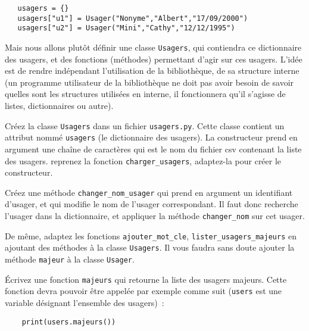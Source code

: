 \documentclass[10pt,a4paper]{sujets-exercices}
\begin{document}
\begin{verbatim}
   usagers = {}
   usagers["u1"] = Usager("Nonyme","Albert","17/09/2000")
   usagers["u2"] = Usager("Mini","Cathy","12/12/1995")
\end{verbatim}

Mais nous allons plutôt définir une classe \texttt{Usagers}, qui contiendra ce dictionnaire des usagers, et des fonctions (méthodes) permettant d'agir sur ces usagers. L'idée est de rendre indépendant l'utilisation de la bibliothèque, de sa structure interne (un programme utilisateur de la bibliothèque ne doit pas avoir besoin de savoir quelles sont les structures utilisées en interne, il fonctionnera qu'il s'agisse de listes, dictionnaires ou autre).

\exercice{} Créez la classe \texttt{Usagers} dans un fichier \texttt{usagers.py}. Cette classe contient un attribut nommé \texttt{usagers} (le dictionnaire des usagers). La constructeur prend en argument une chaîne de caractères qui est le nom du fichier csv contenant la liste des usagers. reprenez la fonction \texttt{charger\_usagers}, adaptez-la pour créer le constructeur.

\exercice{} Créez une méthode \texttt{changer\_nom\_usager} qui prend en argument un identifiant d'usager, et qui modifie le nom de l'usager correspondant. Il faut donc recherche l'usager dans la dictionnaire, et appliquer la méthode \texttt{changer\_nom} sur cet usager. 

\exercice{} De même, adaptez les fonctions \texttt{ajouter\_mot\_cle}, \texttt{lister\_usagers\_majeurs} en ajoutant des méthodes à la classe \texttt{Usagers}. Il vous faudra sans doute ajouter la méthode \texttt{majeur} à la classe \texttt{Usager}.

\exercice{} Écrivez une fonction \verb!majeurs! qui retourne la liste des usagers majeurs. Cette fonction devra pouvoir être appelée par exemple comme suit (\verb!users! est une variable désignant l'ensemble des usagers)~:

\begin{verbatim}
    print(users.majeurs())
\end{verbatim}


  
\end{document}
